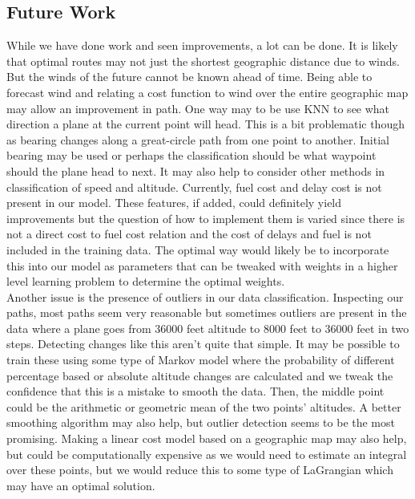 \documentclass{article}[12pt]
\begin{document}
\begin{multicols}{2}
\section{Future Work}
While we have done work and seen improvements, a lot can be done. It is likely that optimal routes may not just the shortest geographic distance due to winds. But the winds of the future cannot be known ahead of time. Being able to forecast wind and relating a cost function to wind over the entire geographic map may allow an improvement in path. One way may to be use KNN to see what direction a plane at the current point will head. This is a bit problematic though as bearing changes along a great-circle path from one point to another. Initial bearing may be used or perhaps the classification should be what waypoint should the plane head to next. It may also help to consider other methods in classification of speed and altitude. Currently, fuel cost and delay cost is not present in our model. These features, if added, could definitely yield improvements but the question of how to implement them is varied since there is not a direct cost to fuel cost relation and the cost of delays and fuel is not included in the training data. The optimal way would likely be to incorporate this into our model as parameters that can be tweaked with weights in a higher level learning problem to determine the optimal weights. \\

Another issue is the presence of outliers in our data classification. Inspecting our paths, most paths seem very reasonable but sometimes outliers are present in the data where a plane goes from 36000 feet altitude to 8000 feet to 36000 feet in two steps. Detecting changes like this aren't quite that simple. It may be possible to train these using some type of Markov model where the probability of different percentage based or absolute altitude changes are calculated and we tweak the confidence that this is a mistake to smooth the data. Then, the middle point could be the arithmetic or geometric mean of the two points' altitudes. A better smoothing algorithm may also help, but outlier detection seems to be the most promising. Making a linear cost model based on a geographic map may also help, but could be computationally expensive as we would need to estimate an integral over these points, but we would reduce this to some type of LaGrangian which may have an optimal solution.


\end{multicols}
\end{document}
